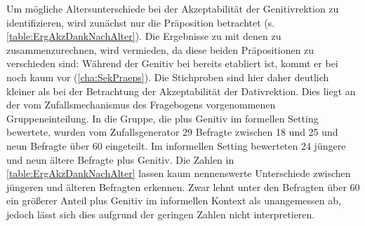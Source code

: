 Um mögliche Altersunterschiede bei der Akzeptabilität der Genitivrektion zu identifizieren, wird zunächst nur die Präposition \dank{} betrachtet (s. \autoref{table:ErgAkzDankNachAlter}). 
Die Ergebnisse zu \dank{} mit denen zu \gegenueber{} zusammenzurechnen, wird vermieden, da diese beiden Präpositionen zu verschieden sind: 
Während der Genitiv bei \dank{} bereits etabliert ist, kommt er bei \gegenueber{} noch kaum vor (\autoref{cha:SekPraeps}). 
Die Stichproben sind hier daher deutlich kleiner als bei der Betrachtung der Akzeptabilität der Dativrektion. 
Dies liegt an der vom Zufallsmechanismus des Fragebogens vorgenommenen Gruppeneinteilung. 
In die Gruppe, die \dank{} plus Genitiv im formellen Setting bewertete, wurden vom Zufallsgenerator 29 Befragte zwischen 18 und 25 und neun Befragte über 60 eingeteilt. 
Im informellen Setting bewerteten 24 jüngere und neun ältere Befragte \dank{} plus Genitiv. 
Die Zahlen in \autoref{table:ErgAkzDankNachAlter} lassen kaum nennenswerte Unterschiede zwischen jüngeren und älteren Befragten erkennen. 
Zwar lehnt unter den Befragten über 60 ein größerer Anteil \dank{} plus Genitiv im informellen Kontext als unangemessen ab, jedoch lässt sich dies aufgrund der geringen Zahlen nicht interpretieren. 
